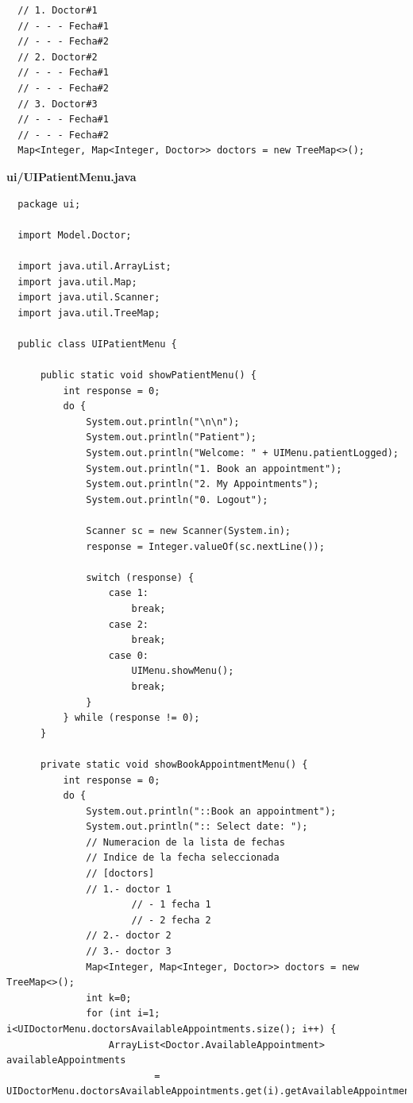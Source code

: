 \documentclass{article}
\begin{document}
\begin{verbatim}
  // 1. Doctor#1
  // - - - Fecha#1
  // - - - Fecha#2
  // 2. Doctor#2
  // - - - Fecha#1
  // - - - Fecha#2
  // 3. Doctor#3
  // - - - Fecha#1
  // - - - Fecha#2
  Map<Integer, Map<Integer, Doctor>> doctors = new TreeMap<>();
\end{verbatim}

\textbf{ui/UIPatientMenu.java}
\begin{verbatim}
  package ui;

  import Model.Doctor;

  import java.util.ArrayList;
  import java.util.Map;
  import java.util.Scanner;
  import java.util.TreeMap;

  public class UIPatientMenu {

      public static void showPatientMenu() {
          int response = 0;
          do {
              System.out.println("\n\n");
              System.out.println("Patient");
              System.out.println("Welcome: " + UIMenu.patientLogged);
              System.out.println("1. Book an appointment");
              System.out.println("2. My Appointments");
              System.out.println("0. Logout");

              Scanner sc = new Scanner(System.in);
              response = Integer.valueOf(sc.nextLine());

              switch (response) {
                  case 1:
                      break;
                  case 2:
                      break;
                  case 0:
                      UIMenu.showMenu();
                      break;
              }
          } while (response != 0);
      }

      private static void showBookAppointmentMenu() {
          int response = 0;
          do {
              System.out.println("::Book an appointment");
              System.out.println(":: Select date: ");
              // Numeracion de la lista de fechas
              // Indice de la fecha seleccionada
              // [doctors]
              // 1.- doctor 1
                      // - 1 fecha 1
                      // - 2 fecha 2
              // 2.- doctor 2
              // 3.- doctor 3
              Map<Integer, Map<Integer, Doctor>> doctors = new TreeMap<>();
              int k=0;
              for (int i=1; i<UIDoctorMenu.doctorsAvailableAppointments.size(); i++) {
                  ArrayList<Doctor.AvailableAppointment> availableAppointments
                          = UIDoctorMenu.doctorsAvailableAppointments.get(i).getAvailableAppointments();


\end{verbatim}
\end{document}
